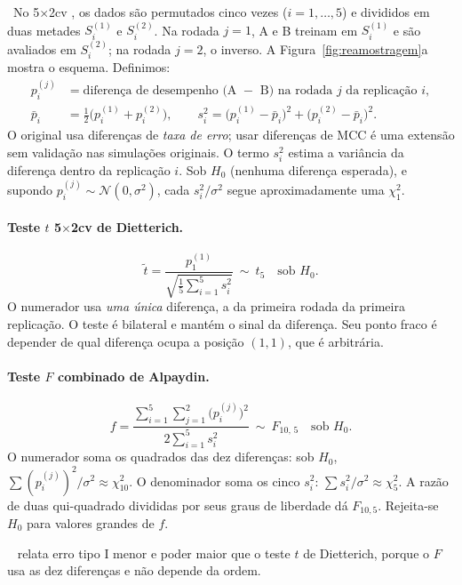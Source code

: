 \documentclass[11pt,a4paper]{article}
\newcommand{\etiqueta}[2]{\tcbox[on line, colback=#1!10, colframe=#1!75!black,
  boxrule=0.4pt, arc=1.2pt, left=1.5pt, right=1.5pt, top=0pt, bottom=0pt,
  fontupper=\sffamily\scriptsize\bfseries]{#2}}
\newcommand{\lit}{\etiqueta{oiBlue}{Literatura}}
\begin{document}
\lit\ No 5$\times$2cv \citep{dietterich1998}, os dados são permutados cinco vezes ($i=1,\dots,5$) e divididos em duas metades $S_i^{(1)}$ e $S_i^{(2)}$. Na rodada $j=1$, A e B treinam em $S_i^{(1)}$ e são avaliados em $S_i^{(2)}$; na rodada $j=2$, o inverso. A Figura~\ref{fig:reamostragem}a mostra o esquema. Definimos:
\begin{align}
p_i^{(j)} &= \text{diferença de desempenho (A $-$ B) na rodada $j$ da replicação $i$},\\
\bar{p}_i &= \tfrac{1}{2}\big(p_i^{(1)}+p_i^{(2)}\big),\qquad
s_i^2=\big(p_i^{(1)}-\bar{p}_i\big)^2+\big(p_i^{(2)}-\bar{p}_i\big)^2 .
\end{align}
O original usa diferenças de \emph{taxa de erro}; usar diferenças de MCC é uma extensão sem validação nas simulações originais. O termo $s_i^2$ estima a variância da diferença dentro da replicação $i$. Sob $H_0$ (nenhuma diferença esperada), e supondo $p_i^{(j)}\sim\mathcal{N}(0,\sigma^2)$, cada $s_i^2/\sigma^2$ segue aproximadamente uma $\chi^2_1$.

\paragraph{Teste $t$ 5$\times$2cv de Dietterich.}
\begin{equation}
\tilde{t}=\frac{p_1^{(1)}}{\sqrt{\tfrac{1}{5}\sum_{i=1}^{5}s_i^2}}\ \sim\ t_5\quad\text{sob }H_0 .
\end{equation}
O numerador usa \emph{uma única} diferença, a da primeira rodada da primeira replicação. O teste é bilateral e mantém o sinal da diferença. Seu ponto fraco é depender de qual diferença ocupa a posição $(1,1)$, que é arbitrária.

\paragraph{Teste $F$ combinado de Alpaydin.}
\begin{equation}
f=\frac{\sum_{i=1}^{5}\sum_{j=1}^{2}\big(p_i^{(j)}\big)^2}{2\sum_{i=1}^{5}s_i^2}\ \sim\ F_{10,\,5}\quad\text{sob }H_0 .
\end{equation}
O numerador soma os quadrados das dez diferenças: sob $H_0$, $\sum(p_i^{(j)})^2/\sigma^2\approx\chi^2_{10}$. O denominador soma os cinco $s_i^2$: $\sum s_i^2/\sigma^2\approx\chi^2_5$. A razão de duas qui-quadrado divididas por seus graus de liberdade dá $F_{10,5}$. Rejeita-se $H_0$ para valores grandes de $f$.

\lit\ \citet{alpaydin1999} relata erro tipo I menor e poder maior que o teste $t$ de Dietterich, porque o $F$ usa as dez diferenças e não depende da ordem.
\end{document}
